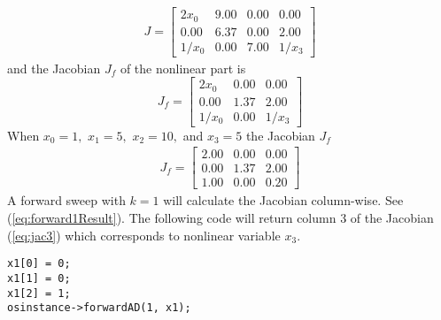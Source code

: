 \documentclass[11pt]{article}
\renewcommand{\_}{{\char"5F}}
\renewcommand{\{}{{\char"7B}}
\renewcommand{\}}{{\char"7D}}
\renewcommand{\^}{{\char"0D}}
\renewcommand{\'}{{\char"0D}}
\begin{document}
\begin{eqnarray}
J =
\left[
\begin{array}{rrrr}
2x_{0} &9.00&0.00&0.00   \\
0.00&6.37&0.00&2.00 \\
1/x_{0}&0.00&7.00&1/x_{3}
\end{array}
\right] \label{eq:jac}
\end{eqnarray}
and the Jacobian $J_f$ of the nonlinear part is
%
\begin{equation}
    J_f = \left[
        \begin{array}{ccc}
            2x_0 & 0.00 & 0.00 \\
            0.00  & 1.37 & 2.00 \\
            1/x_0 & 0.00 & 1/x_3
        \end{array}
    \right]  \label{eq:jac2}
\end{equation}
When $x_{0} = 1,$ $x_{1} = 5,$ $x_{2} = 10,$ and $x_{3} = 5$ the Jacobian $J_f$
\begin{eqnarray}
    J_f = \left[
        \begin{array}{ccc}
            2.00 & 0.00 & 0.00 \\
            0.00 & 1.37 & 2.00 \\
            1.00 & 0.00 & 0.20
        \end{array}
    \right] \label{eq:jac3}
\end{eqnarray}
A forward sweep with $k = 1$ will calculate the Jacobian column-wise.  See
(\ref{eq:forward1Result}).  The following code will return column 3 of the Jacobian (\ref{eq:jac3}) which corresponds to nonlinear variable $x_{3}.$
\begin{verbatim}
x1[0] = 0;
x1[1] = 0;
x1[2] = 1;
osinstance->forwardAD(1, x1);
\end{verbatim}
\end{document}
